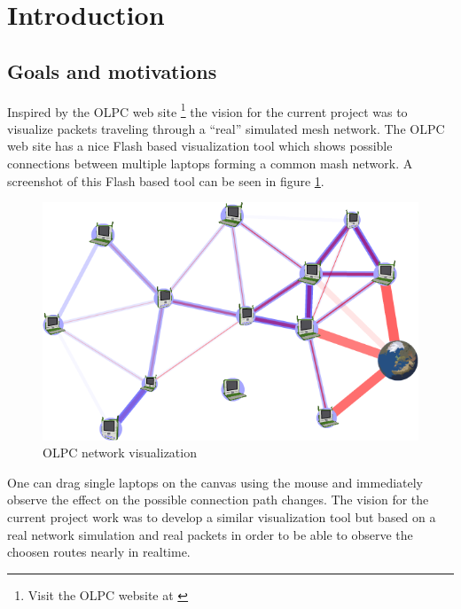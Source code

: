 
\section{Introduction}


\subsection{Goals and motivations}

Inspired by the OLPC web site%
\footnote{Visit the OLPC website at \cite{olpc-website}%
} the vision for the current project was to visualize packets traveling
through a {}``real'' simulated mesh network. The OLPC web site has
a nice Flash based visualization tool which shows possible connections
between multiple laptops forming a common mash network. A screenshot
of this Flash based tool can be seen in figure \ref{fig:OLPC-network-visualization}.

%
\begin{figure}


\begin{centering}
\includegraphics[scale=0.6]{figures/olpc-network}
\par\end{centering}

\caption{\label{fig:OLPC-network-visualization}OLPC network visualization}

\end{figure}


One can drag single laptops on the canvas using the mouse and immediately
observe the effect on the possible connection path changes. The vision
for the current project work was to develop a similar visualization
tool but based on a real network simulation and real packets in order
to be able to observe the choosen routes nearly in realtime.


